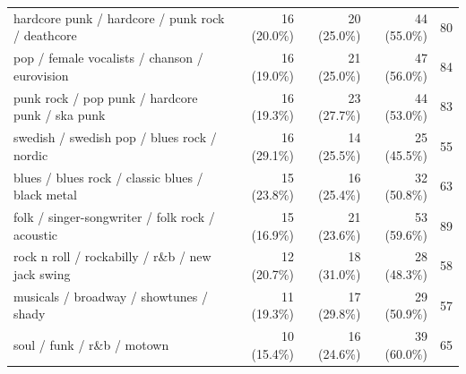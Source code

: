 \begin{table}
\begin{tabular*}{\linewidth}{@{\extracolsep{\fill}}lrrrr}
hardcore punk / hardcore / punk rock / deathcore & 16 (20.0\%) & 20 (25.0\%) & 44 (55.0\%) & 80 \\ 
pop / female vocalists / chanson / eurovision & 16 (19.0\%) & 21 (25.0\%) & 47 (56.0\%) & 84 \\ 
punk rock / pop punk / hardcore punk / ska punk & 16 (19.3\%) & 23 (27.7\%) & 44 (53.0\%) & 83 \\ 
swedish / swedish pop / blues rock / nordic & 16 (29.1\%) & 14 (25.5\%) & 25 (45.5\%) & 55 \\ 
blues / blues rock / classic blues / black metal & 15 (23.8\%) & 16 (25.4\%) & 32 (50.8\%) & 63 \\ 
folk / singer-songwriter / folk rock / acoustic & 15 (16.9\%) & 21 (23.6\%) & 53 (59.6\%) & 89 \\ 
rock n roll / rockabilly / r\&b / new jack swing & 12 (20.7\%) & 18 (31.0\%) & 28 (48.3\%) & 58 \\ 
musicals / broadway / showtunes / shady & 11 (19.3\%) & 17 (29.8\%) & 29 (50.9\%) & 57 \\ 
soul / funk / r\&b / motown & 10 (15.4\%) & 16 (24.6\%) & 39 (60.0\%) & 65 \\ 
\bottomrule
\end{tabular*}
\end{table}

